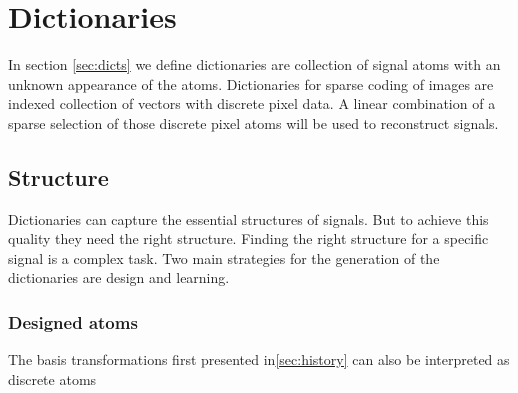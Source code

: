 \chapter{Dictionaries}
In section \ref{sec:dicts} we define dictionaries are
collection of signal atoms with an unknown appearance of the atoms. Dictionaries
for sparse coding of images are indexed collection of vectors with discrete
pixel data. A linear combination of a sparse selection of those discrete pixel
atoms will be used to reconstruct signals.

\section{Structure}
Dictionaries can capture the essential structures of signals. But to achieve
this quality they need the right structure. Finding the right structure for a
specific signal is a complex task.
Two main strategies for the generation of the dictionaries are design and
learning.

\subsection{Designed atoms}
The basis transformations first presented in\ref{sec:history} can also
be interpreted as discrete atoms 


